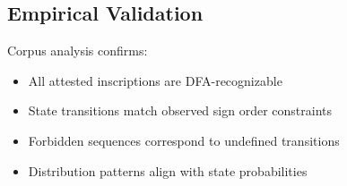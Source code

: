 \subsection{Empirical Validation}

Corpus analysis confirms:
\begin{itemize}
    \item All attested inscriptions are DFA-recognizable
    \item State transitions match observed sign order constraints
    \item Forbidden sequences correspond to undefined transitions
    \item Distribution patterns align with state probabilities
\end{itemize}

